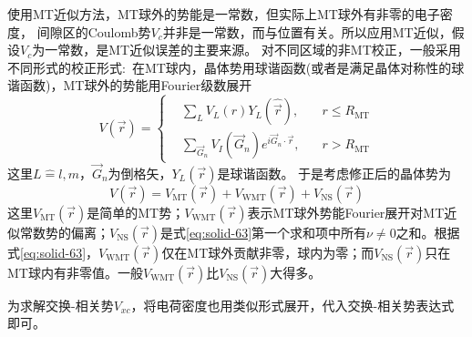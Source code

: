 使用MT近似方法，MT球外的势能是一常数，但实际上MT球外有非零的电子密度，%
间隙区的Coulomb势$V_c$并非是一常数，而与位置有关。所以应用MT近似，假设$V_c$为一常数，是MT近似误差的主要来源。 
对不同区域的非MT校正，一般采用不同形式的校正形式:~在MT球内，晶体势用球谐函数(或者是满足晶体对称性的球谐函数)，MT球外的势能用Fourier级数展开\cite{PRB13-5362_1976}
\begin{equation}
  V(\vec r)=\left\{
  \begin{aligned}
	  &\sum_LV_L(r)Y_L(\hat{\vec r}),\quad &r\leqslant R_{\mathrm{MT}}\\
	  &\sum_{\vec G_n}V_I(\vec G_n)e^{i\vec G_n\cdot\vec r},&r>R_{\mathrm{MT}}
  \end{aligned}\right.
  \label{eq:solid-63}
\end{equation}
这里$L\hat=l,m$，$\vec G_n$为倒格矢，$Y_L(\vec r)$是球谐函数。%
于是考虑修正后的晶体势为
\begin{equation}
	V(\vec r)=V_{\mathrm{MT}}(\vec r)+V_{\mathrm{WMT}}(\vec r)+V_{\mathrm{NS}}(\vec r)
  \label{eq:solid-64}
\end{equation}
这里$V_{\mathrm{MT}}(\vec r)$是简单的MT势；$V_{\mathrm{WMT}}(\vec r)$表示MT球外势能Fourier展开对MT近似常数势的偏离；$V_{\mathrm{NS}}(\vec r)$是式\eqref{eq:solid-63}第一个求和项中所有$\nu$$\neq$0之和。根据式\eqref{eq:solid-63}，$V_{\mathrm{WMT}}(\vec r)$仅在MT球外贡献非零，球内为零；而$V_{\mathrm{NS}}(\vec r)$只在MT球内有非零值。一般$V_{\mathrm{WMT}}(\vec r)$比$V_{\mathrm{NS}}(\vec r)$大得多。

为求解交换-相关势$V_{xc}$，将电荷密度也用类似形式展开，代入交换-相关势表达式即可。

